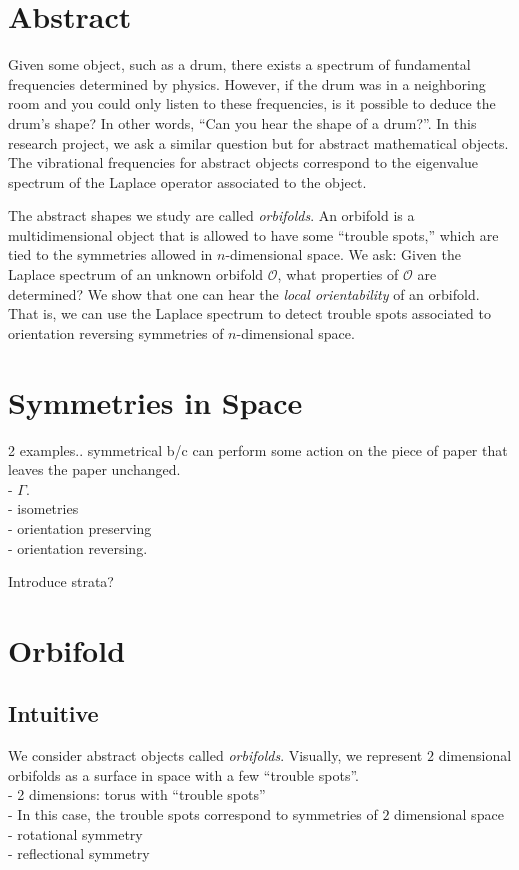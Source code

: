 \documentclass{article}
\begin{document}
\section{Abstract}


\hspace{\parindent} Given some object, such as a drum, there exists a
spectrum of fundamental frequencies determined by physics. However, if the
drum was in a neighboring room and you could only listen to these
frequencies, is it possible to deduce the drum's shape? In other words,
``Can you hear the shape of a drum?''. In this research project, we ask a
similar question but for abstract mathematical objects. The vibrational
frequencies for abstract objects correspond to the eigenvalue spectrum of
the Laplace operator associated to the object. 

The abstract shapes we study are called \emph{orbifolds}. An orbifold is a
multidimensional object that is allowed to have some ``trouble spots,''
which are tied to the symmetries allowed in $n$-dimensional space. We ask:
Given the Laplace spectrum of an unknown orbifold $\mathcal{O}$, what
properties of $\mathcal{O}$ are determined?  We show that one can hear the
\emph{local orientability} of an orbifold.  That is, we can use the Laplace
spectrum to detect trouble spots associated to orientation reversing
symmetries of $n$-dimensional space.


\section{Symmetries in Space}

2 examples..
symmetrical b/c can perform some action on the piece of paper that leaves
the paper unchanged.
\\- $\Gamma$.
\\- isometries
\\- orientation preserving
\\- orientation reversing.

Introduce strata?

\section{Orbifold}
\subsection{Intuitive}

We consider abstract objects called \emph{orbifolds}. Visually, we
represent $2$ dimensional orbifolds as a surface in space with a few
``trouble spots''. 
\\- 2 dimensions: torus with ``trouble spots''
\\- In this case, the trouble spots correspond to symmetries of $2$
dimensional space
\\- rotational symmetry
\\- reflectional symmetry
\end{document}
